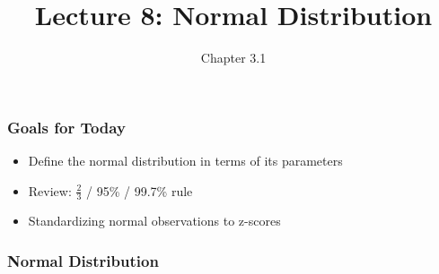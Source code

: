 \documentclass[handout]{beamer}
\title{Lecture 8: Normal Distribution}
\author{Chapter 3.1}
\date{}
\newcommand{\blue}[1]{\textcolor{blue2}{#1}}
\begin{document}
\begin{frame}
\titlepage
\end{frame}


\begin{frame}
\frametitle{Goals for Today}

\begin{itemize}
\item Define the normal distribution in terms of its \blue{parameters}
\item Review: $\frac{2}{3}$ / 95\% / 99.7\% rule
\item Standardizing normal observations to \blue{z-scores}
\end{itemize}


\end{frame}


\begin{frame}[fragile]
\frametitle{Normal Distribution}
%
%
%


\end{frame}
\end{document}
